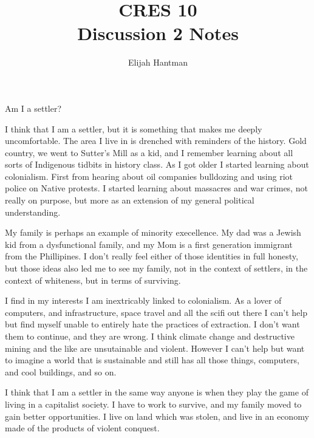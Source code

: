 \documentclass{report}
\title{\Huge{CRES 10}\\Discussion 2 Notes}
\author{\huge{Elijah Hantman}}
\date{}
\begin{document}
\maketitle
\newpage

\begin{description}
    \item Am I a settler?
        \begin{mdframed}
            I think that I am a settler, but it is something that makes me
            deeply uncomfortable. The area I live in is drenched with
            reminders of the history. Gold country, we went to Sutter's
            Mill as a kid, and I remember learning about all sorts of
            Indigenous tidbits in history class. As I got older I started learning
            about colonialism. First from hearing about oil companies bulldozing and using
            riot police on Native protests. I started learning about massacres
            and war crimes, not really on purpose, but more as an extension
            of my general political understanding.

            My family is perhaps an example of minority execellence. My dad
            was a Jewish kid from a dysfunctional family, and my Mom is
            a first generation immigrant from the Phillipines. I don't
            really feel either of those identities in full honesty,
            but those ideas also led me to see my family, not in the
            context of settlers, in the context of whiteness, but in
            terms of surviving.

            I find in my interests I am inextricably linked to colonialism.
            As a lover of computers, and infrastructure, space travel
            and all the scifi out there I can't help but find myself unable
            to entirely hate the practices of extraction. I don't want them
            to continue, and they are wrong. I think climate change and 
            destructive mining and the like are unsutainable and violent.
            However I can't help but want to imagine a world that is sustainable
            and still has all those things, computers, and cool buildings, and
            so on.

            I think that I am a settler in the same way anyone is when they
            play the game of living in a capitalist society. I have to work
            to survive, and my family moved to gain better opportunities.
            I live on land which was stolen, and live in an economy made
            of the products of violent conquest. 


\end{mdframed}
\end{description}
\end{document}
